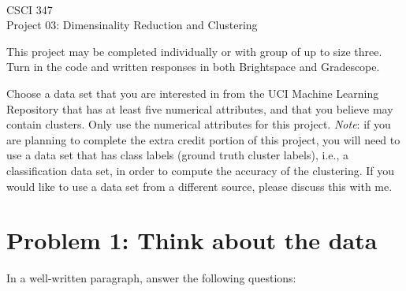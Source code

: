 \documentclass[11pt]{article}
\newcommand{\course}{CSCI 347}
\newcommand{\proj}{Project 03: Dimensinality Reduction and Clustering}
\begin{document}
{ ~\\
    \course \\ 
    \proj \\ 
}

This project may be completed individually or with group of up to size three.
Turn in the code and written responses in both Brightspace and Gradescope.

Choose a data set that you are interested in from the UCI Machine Learning
Repository that has at least five numerical attributes, and that you believe may
contain clusters. Only use the numerical attributes for this project.
\emph{Note}: if you are planning to complete the extra credit portion of this
project, you will need to use a data set that has class labels (ground truth
cluster labels), i.e., a classification data set, in order to compute the
accuracy of the clustering. If you would like to use a data set from a different
source, please discuss this with me.

\section*{Problem 1: Think about the data}

In a well-written paragraph, answer the following questions:
\end{document}

